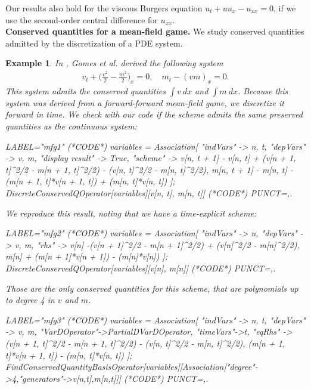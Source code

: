 \documentclass[manuscript]{acmart}
\newcommand{\1}{{\chi}}
\numberwithin{equation}{section}
\theoremstyle{thmlemcorr}
\numberwithin{theorem}{section}
\theoremstyle{thmlemcorr*}
\theoremstyle{defi}
\theoremstyle{remexample}
\newtheorem{example}[theorem]{Example}
\theoremstyle{ass}
\begin{document}
	Our results also hold for the viscous Burgers equation $u_t+uu_x-u_{xx}=0$, if we use the second-order central difference for $u_{xx}$.\\
{\bf Conserved quantities for a mean-field game.}
We study conserved quantities admitted by the discretization of a PDE system.
\begin{example}
	In \cite{gomes18}, Gomes et al. derived the following system
	\begin{gather*}
		v_t+\Big(\frac{v^2}{2}-\frac{m^2}{2}\Big)_x=0,\quad
		m_t-(vm)_x=0.
	\end{gather*}
	This system admits the conserved quantities $\int v\ dx$ and $\int m\ dx$.
	Because this system was derived from a forward-forward mean-field game, we discretize it forward in time. We check with our code if the scheme admits the same preserved quantities as the continuous system:
	\begin{EXE}
		LABEL="mfg1"
		(*CODE*)
		variables = Association[
		"indVars" -> {n, t},
		"depVars" -> {v, m},
		"display result" -> True,
		"scheme" -> {v[n, t + 1] - 
			v[n, 
			t] + (v[n + 1, t]^2/2 - m[n + 1, t]^2/2) - (v[n, t]^2/2 - 
			m[n, t]^2/2), 
			m[n, t + 1] - 
			m[n, t] - (m[n + 1, t]*v[n + 1, t]) + (m[n, t]*v[n, t])}
		];
		DiscreteConservedQOperator[variables][{v[n, t], m[n, t]}]
		(*CODE*)
		PUNCT={,.}
	\end{EXE}
	\begin{small}
		
		
	\end{small}
	We reproduce this result, noting that we have a time-explicit scheme:
	\begin{EXE}
		LABEL="mfg2"
		(*CODE*)
		variables = Association[
		"indVars" -> {n},
		"depVars" -> {v, m},
		"rhs" -> { 
			v[n] -(v[n + 1]^2/2 - m[n + 1]^2/2) + (v[n]^2/2 - 
			m[n]^2/2), 
			m[n] + (m[n + 1]*v[n + 1]) - (m[n]*v[n])}
		];
		DiscreteConservedQOperator[variables][{v[n], m[n]}]
		(*CODE*)
		PUNCT={,.}
	\end{EXE}
	\begin{small}
		
		
	\end{small}
	Those are the only conserved quantities for this scheme, that are polynomials up to degree 4 in $v$ and $m$.
	\begin{EXE}
		LABEL="mfg3"
		(*CODE*)
		variables = Association[
		"indVars" -> {n, t},
		"depVars" -> {v, m},
		"VarDOperator"->PartialDVarDOperator,
		"timeVars"->{t},
		"eqRhs" -> { 
			(v[n + 1, t]^2/2 - m[n + 1, t]^2/2) - (v[n, t]^2/2 - 
			m[n, t]^2/2), 
			(m[n + 1, t]*v[n + 1, t]) - (m[n, t]*v[n, t])}
		];
		FindConservedQuantityBasisOperator[variables][Association["degree"->4,"generators"->{v[n,t],m[n,t]}]]
		(*CODE*)
		PUNCT={,.}
	\end{EXE}
	\begin{small}
		
		
	\end{small}
\end{example}
\end{document}
